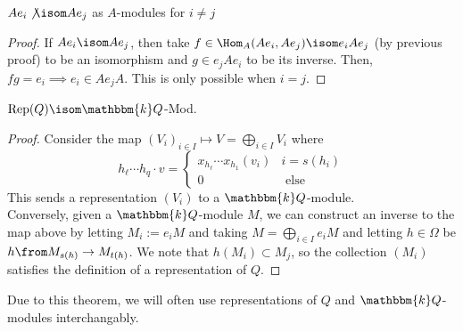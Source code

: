 \documentclass[11pt,leqno,oneside]{amsbook}
\numberwithin{thm}{section}
\newcommand{\bbk}{\mathbbm{k}} %
\newcommand{\Rep}{\operatorname{Rep}} %
\renewcommand{\Q}{Q} %
\begin{document}
\begin{prop}
  \(A e_i \not \isom A e_j\) as \(A\)-modules for \(i \neq j\)
\end{prop}
\begin{proof}
  If \(A e_i \isom A e_j\), then take \(f \in \Hom_A(A e_i, A e_j)
  \isom e_i A e_j\) (by previous proof) to be an isomorphism and \(g
  \in e_j A e_i\)
  to be its inverse. Then, \(fg = e_i \implies e_i \in A e_j A\). This
  is only possible when \(i = j\). 
\end{proof}
\begin{prop}
  \(\Rep(\Q) \isom \bbk Q\)-Mod.
\end{prop}
\begin{proof}
  Consider the map \((V_i)_{i \in I} \mapsto V = \bigoplus_{i \in
    I} V_i\) where \[
    h_\ell \cdots h_q \cdot v =
    \begin{cases}
      x_{h_\ell} \cdots x_{h_1} (v_i) & i = s(h_i) \\
      0 & \text{ else }
    \end{cases}
  \]
  This sends a representation \((V_i)\) to a \(\bbk \Q\)-module.  \\
  
  Conversely, given a \(\bbk \Q\)-module \(M\), we can construct an
  inverse to the map above by letting 
  \(M_i := e_i M\) and taking \(M = \bigoplus_{i \in I} e_i M\) and
  letting \(h \in \Omega\) be \(h \from M_{s(h)} \to M_{t(h)}\). We
  note that \(h(M_i) \subset M_j\), so the collection \((M_i)\)
  satisfies the definition of a representation of \(\Q\). 
\end{proof}
Due to this theorem, we will often use representations of \(\Q\) and
\(\bbk \Q\)-modules interchangably.
\end{document}
